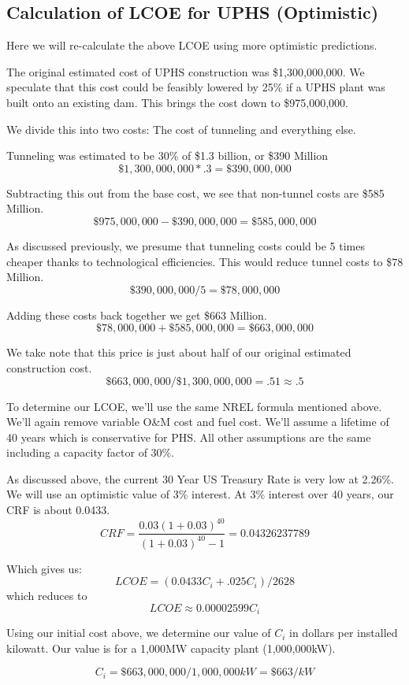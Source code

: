 \subsection{Calculation of LCOE for UPHS (Optimistic)}
Here we will re-calculate the above LCOE using more optimistic predictions.

The original estimated cost of UPHS construction was \$1,300,000,000. We speculate that this cost could be feasibly lowered by 25\% if a UPHS plant was built onto an existing dam. This brings the cost down to \$975,000,000.

We divide this into two costs: The cost of tunneling and everything else.

Tunneling was estimated to be 30\% of \$1.3 billion, or \$390 Million
\[ \$1,300,000,000 * .3 = \$390,000,000\]

Subtracting this out from the base cost, we see that non-tunnel costs are \$585 Million.
\[ \$975,000,000 - \$390,000,000 = \$585,000,000\]

As discussed previously, we presume that tunneling costs could be 5 times cheaper thanks to technological efficiencies. This would reduce tunnel costs to \$78 Million.
\[ \$390,000,000 / 5 = \$78,000,000\]

Adding these costs back together we get \$663 Million.
\[ \$78,000,000 + \$585,000,000 = \$663,000,000 \]

We take note that this price is just about half of our original estimated construction cost.
\[  \$663,000,000  / \$1,300,000,000 = .51 \approx .5 \]

To determine our LCOE, we'll use the same NREL formula mentioned above. We'll again remove variable O\&M cost and fuel cost. We'll assume a lifetime of 40 years which is conservative for PHS. All other assumptions are the same including a capacity factor of 30\%.

As discussed above, the current 30 Year US Treasury Rate is very low at 2.26\%. We will use an optimistic value of 3\% interest. At 3\% interest over 40 years, our CRF is about 0.0433.
\[ \displaystyle CRF={\frac {0.03(1+0.03)^{40}}{(1+0.03)^{40}-1}} = 0.04326237789 \]

Which gives us:
\[ LCOE = (0.0433C_i + .025C_i) / 2628 \]
which reduces to
\[ LCOE \approx 0.00002599 C_i \]

Using our initial cost above, we determine our value of $C_i$ in dollars per installed kilowatt. Our value is for a 1,000MW capacity plant (1,000,000kW).

\[ C_i = \$663,000,000 / 1,000,000kW = \$663/kW\]

